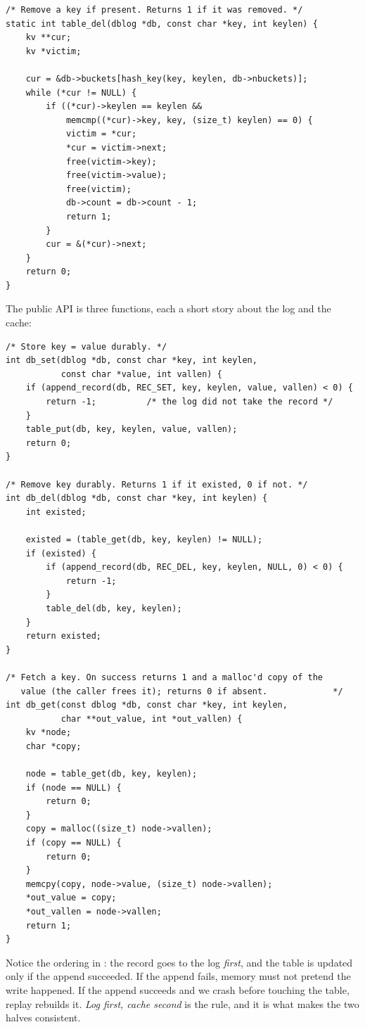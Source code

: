 \begin{lstlisting}[caption={The database: a log plus a hash-table cache.}]
/* Remove a key if present. Returns 1 if it was removed. */
static int table_del(dblog *db, const char *key, int keylen) {
    kv **cur;
    kv *victim;

    cur = &db->buckets[hash_key(key, keylen, db->nbuckets)];
    while (*cur != NULL) {
        if ((*cur)->keylen == keylen &&
            memcmp((*cur)->key, key, (size_t) keylen) == 0) {
            victim = *cur;
            *cur = victim->next;
            free(victim->key);
            free(victim->value);
            free(victim);
            db->count = db->count - 1;
            return 1;
        }
        cur = &(*cur)->next;
    }
    return 0;
}
\end{lstlisting}

The public API is three functions, each a short story about the log
and the cache:

\begin{lstlisting}[caption={The API: log first, then cache.}]
/* Store key = value durably. */
int db_set(dblog *db, const char *key, int keylen,
           const char *value, int vallen) {
    if (append_record(db, REC_SET, key, keylen, value, vallen) < 0) {
        return -1;          /* the log did not take the record */
    }
    table_put(db, key, keylen, value, vallen);
    return 0;
}

/* Remove key durably. Returns 1 if it existed, 0 if not. */
int db_del(dblog *db, const char *key, int keylen) {
    int existed;

    existed = (table_get(db, key, keylen) != NULL);
    if (existed) {
        if (append_record(db, REC_DEL, key, keylen, NULL, 0) < 0) {
            return -1;
        }
        table_del(db, key, keylen);
    }
    return existed;
}

/* Fetch a key. On success returns 1 and a malloc'd copy of the
   value (the caller frees it); returns 0 if absent.             */
int db_get(const dblog *db, const char *key, int keylen,
           char **out_value, int *out_vallen) {
    kv *node;
    char *copy;

    node = table_get(db, key, keylen);
    if (node == NULL) {
        return 0;
    }
    copy = malloc((size_t) node->vallen);
    if (copy == NULL) {
        return 0;
    }
    memcpy(copy, node->value, (size_t) node->vallen);
    *out_value = copy;
    *out_vallen = node->vallen;
    return 1;
}
\end{lstlisting}

Notice the ordering in : the record goes to the log
\emph{first}, and the table is updated only if the append succeeded.
If the append fails, memory must not pretend the write happened. If
the append succeeds and we crash before touching the table, replay
rebuilds it. \emph{Log first, cache second} is the rule, and it is
what makes the two halves consistent.


